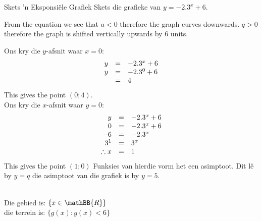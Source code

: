  
\begin{wex}{Skets ’n Eksponsiële Grafiek}
{
Skets die grafieke van $y=-2.3^{x}+6$.}
{
From the equation we see that $a<0$ therefore the graph curves downwards. $q>0$ therefore the graph is shifted vertically upwards by $6$ units.

Ons kry die $y$-afsnit waar $x=0$:
\begin{equation*}
\begin{array}{ccl}\hfill y& =& -2.3^{x}+6\hfill \\
 \hfill y& =& -2.3^{0}+6\hfill \\
 & =& 4\hfill \\

\end{array}
\end{equation*}
This gives the point $(0;4)$.\\

Ons kry die $x$-afsnit waar $y=0$:
\begin{equation*}
\begin{array}{ccl}\hfill y& =& -2.3^{x}+6\hfill \\
 \hfill 0& =& -2.3^{x}+6\hfill \\
 \hfill -6& =& -2.3^{x}\hfill \\
 \hfill {3}^{1}& =& {3}^{x}\hfill \\
\hfill \therefore x & =& 1 
\end{array}
\end{equation*}
This gives the point $(1; 0)$
Funksies van hierdie vorm het een asimptoot. Dit lê by $y=q$ die asimptoot van die grafiek is by $y=5$.



\\
Die gebied is: $\{x \in \mathBB{R}\}$\\
die terrein is: $\{g(x): g(x) <6\}$\\

}
\end{wex}




